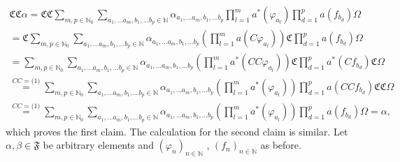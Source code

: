 \documentclass[a4paper,12pt]{article}
\newcommand{\equalmath}[1]{\ensuremath{\stackrel{#1}{=}}}
\begin{document}
\begin{multline}
\mathfrak{C}\mathfrak{C} \alpha =\mathfrak{C}\mathfrak{C} \sum_{m,p \in \mathbb{N}_0} \sum_{a_1, \dots a_m, b_1 , \dots b_p \in \mathbb{N}} \alpha_{a_1,\dots a_m, b_1, \dots b_p} \prod_{l=1}^m a^*(\varphi_{a_l}) \prod_{d=1}^p a(f_{b_d}) \Omega \\
=\mathfrak{C} \sum_{m,p \in \mathbb{N}_0} \sum_{a_1, \dots a_m, b_1 , \dots b_p \in \mathbb{N}} \alpha_{a_1,\dots a_m, b_1, \dots b_p} \left(\prod_{l=1}^m a(C \varphi_{a_l}) \right) \mathfrak{C}\prod_{d=1}^p a(f_{b_d}) \Omega \\
= \sum_{m,p \in \mathbb{N}_0} \sum_{a_1, \dots a_m, b_1 , \dots b_p \in \mathbb{N}} \alpha_{a_1,\dots a_m, b_1, \dots b_p} \left(\prod_{l=1}^m a^*(C C \varphi_{a_l}) \right) \mathfrak{C}\prod_{d=1}^p a^*(C f_{b_d}) \mathfrak{C}\Omega \\
\equalmath{CC=\mathds(1)}\sum_{m,p \in \mathbb{N}_0} \sum_{a_1, \dots a_m, b_1 , \dots b_p \in \mathbb{N}} \alpha_{a_1,\dots a_m, b_1, \dots b_p} \left(\prod_{l=1}^m a^*( \varphi_{a_l}) \right) \prod_{d=1}^p a(C C f_{b_d}) \mathfrak{C}\mathfrak{C}\Omega \\
\equalmath{CC=\mathds(1)}\sum_{m,p \in \mathbb{N}_0} \sum_{a_1, \dots a_m, b_1 , \dots b_p \in \mathbb{N}} \alpha_{a_1,\dots a_m, b_1, \dots b_p} \left(\prod_{l=1}^m a^*( \varphi_{a_l}) \right) \prod_{d=1}^p a(f_{b_d})\Omega =\alpha ,
\end{multline}
which proves the first claim. The calculation for the second claim is similar. Let \(\alpha, \beta \in \mathfrak{F}\) be arbitrary elements and \((\varphi_n)_{n\in \mathbb{N}}\) , \((f_n)_{n\in \mathbb{N}}\) as before.
\end{document}
